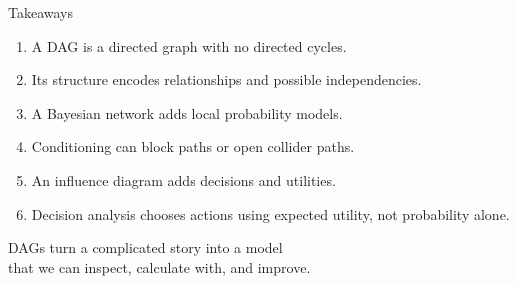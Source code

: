 \documentclass[aspectratio=43,11pt]{beamer}
\begin{document}
\begin{frame}{Takeaways}

\begin{enumerate}
  \item A DAG is a directed graph with no directed cycles.
  \item Its structure encodes relationships and possible independencies.
  \item A Bayesian network adds local probability models.
  \item Conditioning can block paths or open collider paths.
  \item An influence diagram adds decisions and utilities.
  \item Decision analysis chooses actions using expected utility, not
        probability alone.
\end{enumerate}

\bigskip

\begin{center}
\Large
DAGs turn a complicated story into a model\\
that we can inspect, calculate with, and improve.
\end{center}

\end{frame}

%
%
%
%

\end{document}

